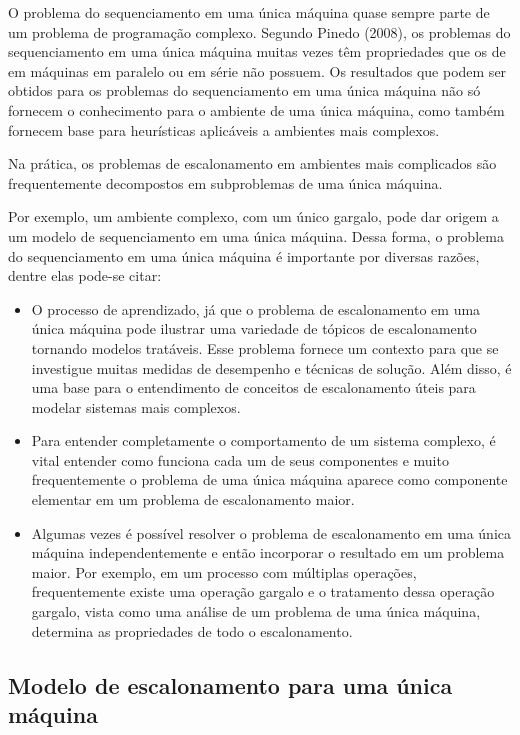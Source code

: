
O problema do sequenciamento em uma única máquina quase sempre parte de um problema de programação complexo.  Segundo Pinedo (2008), os problemas do sequenciamento em uma única máquina  muitas vezes têm propriedades que os de em máquinas em paralelo ou em série  não possuem. Os resultados que podem ser obtidos para os problemas do  sequenciamento em uma única máquina não só fornecem o conhecimento para o ambiente de uma única máquina, como também fornecem base para heurísticas  aplicáveis a ambientes mais complexos. 

Na prática, os problemas de escalonamento em ambientes mais complicados são frequentemente decompostos em subproblemas de uma única máquina. 

Por exemplo, um ambiente complexo, com um único gargalo, pode dar origem a um modelo de sequenciamento em uma única máquina. Dessa forma, o problema do sequenciamento em uma única máquina é importante por diversas razões, dentre elas pode-se citar: 

\begin{itemize}
\item O processo de aprendizado, já que o problema de escalonamento em uma única máquina  pode ilustrar uma variedade de tópicos de escalonamento tornando modelos tratáveis. Esse problema fornece um contexto para que se  investigue muitas medidas de desempenho e técnicas de solução. Além disso, é uma base para o entendimento de  conceitos de escalonamento úteis para modelar sistemas mais complexos. 

\item Para entender completamente o comportamento de um sistema  complexo, é vital entender como funciona cada um de seus componentes e muito frequentemente o problema de uma única máquina aparece como componente elementar em um problema de escalonamento maior. 

\item Algumas vezes é possível resolver o problema de escalonamento em uma única máquina independentemente e então incorporar o resultado em um problema maior. Por exemplo, em um processo com múltiplas operações, frequentemente existe uma operação gargalo e o tratamento dessa operação gargalo, vista como uma análise de um problema de uma única máquina, determina as propriedades de todo o escalonamento. 

\end{itemize}

\subsection{Modelo de escalonamento para uma única máquina}

